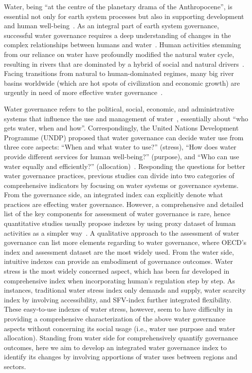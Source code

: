 
Water, being ``at the centre of the planetary drama of the Anthropocene'', is essential not only for earth system processes but also in supporting development and human well-being~\cite{gleeson2020a,gleeson2020b}.
As an integral part of earth system governance, successful water governance requires a deep understanding of changes in the complex relationships between humans and water~\cite{ahlstrom2021,biermann2012,steffen2020}.
Human activities stemming from our reliance on water have profoundly modified the natural water cycle, resulting in rivers that are dominated by a hybrid of social and natural drivers~\cite{sivapalan2012,qin2014a,abbott2019}.
Facing transitions from natural to human-dominated regimes, many big river basins worldwide (which are hot spots of civilization and economic growth) are urgently in need of more effective water governance~\cite{best2019,dibaldassarre2019}.

Water governance refers to the political, social, economic, and administrative systems that influence the use and management of water~\cite{oecd2018, wang2017}, essentially about ``who gets water, when and how''\cite{lasswell2018,allan2001}.
Correspondingly, the United Nations Development Programme (UNDP) proposed that water governance can decide water use from three core aspects: ``When and what water to use?'' (stress), ``How does water provide different services for human well-being?'' (purpose), and ``Who can use water equally and efficiently?'' (allocation)~\cite{mariajacobson2013}.
Responding the questions for better water governance practices, previous studies can divide into two categories of comprehensive indicators by focusing on water systems or governance systems.
From the governance side, an integrated index can explicitly denote what practices are effecting water governance.
However, a comprehensive and detailed list of the key components for assessment of water governance is rare, hence quantitative studies usually propose indexes by using proxy dataset of human activities as a simpler way~\cite{varis2019}.
A qualitative approach to the assessment of water governance can list more elements regarding to water governance, where OECD's index and assessment dataset are the most widely used. %
From the water side, intuitive indexes can provide an embodiment of governance outcomes.
Water stress is the most widely concerned aspect, which has been far developed in comprehensive index when incorporating human's regulation step by step.
As instances, traditional water stress index only demands and supply, water scarcity index by involving accessibility, and SFV-index further integrated flexibility.
These easy-to-use indexes of water stress, however, seem to have difficulty in providing a comprehensive characterization of the above water governance aspects without concerning its social usage (i.e., water use purpose and water allocation).
Standing from water side for comprehensively quantify governance outcomes, here we aim to develop an integrated water governance index to identify its changes by involving apportions of water uses between regions and sectors.

